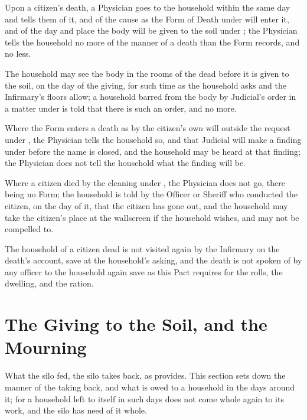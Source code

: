 \begin{clauses}
\item Upon a citizen's death, a Physician goes to the household within the same day and tells them of it, and of the cause as the Form of Death under  will enter it, and of the day and place the body will be given to the soil under ; the Physician tells the household no more of the manner of a death than the Form records, and no less.
\item The household may see the body in the rooms of the dead before it is given to the soil, on the day of the giving, for such time as the household asks and the Infirmary's floors allow; a household barred from the body by Judicial's order in a matter under  is told that there is such an order, and no more.
\item Where the Form enters a death as by the citizen's own will outside the request under , the Physician tells the household so, and that Judicial will make a finding under  before the name is closed, and the household may be heard at that finding; the Physician does not tell the household what the finding will be.
\item Where a citizen died by the cleaning under , the Physician does not go, there being no Form; the household is told by the Officer or Sheriff who conducted the citizen, on the day of it, that the citizen has gone out, and the household may take the citizen's place at the wallscreen if the household wishes, and may not be compelled to.
\item The household of a citizen dead is not visited again by the Infirmary on the death's account, save at the household's asking, and the death is not spoken of by any officer to the household again save as this Pact requires for the rolls, the dwelling, and the ration.
\end{clauses}

\section{The Giving to the Soil, and the Mourning}
\label{sec:health:giving-to-the-soil-and-the-mourning}

What the silo fed, the silo takes back, as  provides. This section sets down the manner of the taking back, and what is owed to a household in the days around it; for a household left to itself in such days does not come whole again to its work, and the silo has need of it whole.

